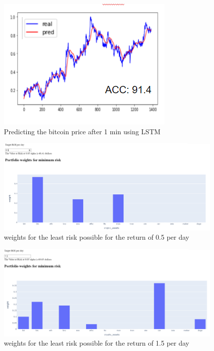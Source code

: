 \documentclass[final]{cvpr}
\begin{document}
\begin{figure}[h!]
\begin{center}
\caption{Predicting the bitcoin price after 1 min using LSTM}
\includegraphics[width=0.8\linewidth]{latex/LSTM_1min.PNG}
\end{center}
\label{fig:LSTM1}
\end{figure}

\begin{figure}[h!]
\begin{center}
\includegraphics[width=0.8\linewidth]{latex/roi5.PNG}
\end{center}
   \caption{weights for the least risk possible for the return of 0.5 per day}
\label{fig:roi5}
\end{figure}

\begin{figure}[h!]
\begin{center}
\includegraphics[width=0.8\linewidth]{latex/roi32.PNG}
\end{center}
   \caption{weights for the least risk possible for the return of 1.5 per day}
\label{fig:roi32}
\end{figure}
\end{document}
